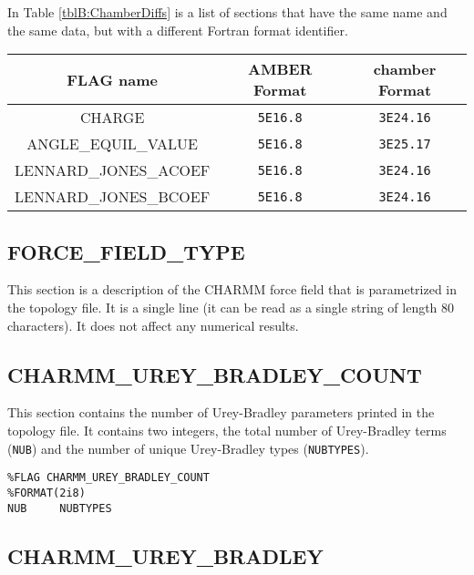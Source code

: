 In Table \ref{tblB:ChamberDiffs} is a list of sections that have the same name
and the same data, but with a different Fortran format identifier.

\begin{table*}
   \caption{List of flags that are common between Amber and chamber topology
            files, but have different {\tt FORMAT} identifiers.}
   \begin{tabular}{|c|c|c|}
      \hline
      FLAG name & AMBER Format & chamber Format \\
      \hline
      CHARGE & {\tt 5E16.8} & {\tt 3E24.16} \\
      ANGLE\_EQUIL\_VALUE & {\tt 5E16.8} & {\tt 3E25.17} \\
      LENNARD\_JONES\_ACOEF & {\tt 5E16.8} & {\tt 3E24.16} \\
      LENNARD\_JONES\_BCOEF & {\tt 5E16.8} & {\tt 3E24.16} \\
      \hline
   \end{tabular}
   \label{tblB:ChamberDiffs}
\end{table*}

\subsection*{FORCE\_FIELD\_TYPE}

This section is a description of the CHARMM force field that is parametrized in
the topology file. It is a single line (it can be read as a single string of
length 80 characters). It does not affect any numerical results.


\subsection*{CHARMM\_UREY\_BRADLEY\_COUNT}

This section contains the number of Urey-Bradley parameters printed in the
topology file. It contains two integers, the total number of Urey-Bradley terms
({\tt NUB}) and the number of unique Urey-Bradley types ({\tt NUBTYPES}).

\begin{verbatim}
%FLAG CHARMM_UREY_BRADLEY_COUNT
%FORMAT(2i8)
NUB     NUBTYPES
\end{verbatim}

\subsection*{CHARMM\_UREY\_BRADLEY}

